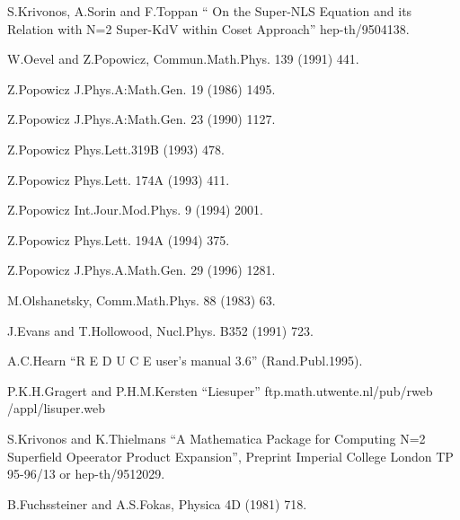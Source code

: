 \begin{thebibliography}{99}
\item{} S.Krivonos, A.Sorin and F.Toppan `` On the Super-NLS Equation and its
        Relation with N=2 Super-KdV within Coset Approach'' hep-th/9504138.

\item{} W.Oevel and Z.Popowicz, Commun.Math.Phys. 139 (1991) 441.

\item{} Z.Popowicz J.Phys.A:Math.Gen. 19 (1986) 1495.

\item{} Z.Popowicz J.Phys.A:Math.Gen. 23 (1990) 1127.

\item{} Z.Popowicz Phys.Lett.319B (1993) 478.

\item{} Z.Popowicz Phys.Lett. 174A (1993) 411.

\item{} Z.Popowicz Int.Jour.Mod.Phys. 9 (1994) 2001.

\item{} Z.Popowicz Phys.Lett. 194A (1994) 375.

\item{} Z.Popowicz J.Phys.A.Math.Gen. 29 (1996) 1281.

\item{} M.Olshanetsky, Comm.Math.Phys. 88 (1983) 63.

\item{} J.Evans and T.Hollowood, Nucl.Phys. B352 (1991) 723.

\item{} A.C.Hearn ``R E D U C E user's manual 3.6'' (Rand.Publ.1995).

\item{} P.K.H.Gragert and P.H.M.Kersten  ``Liesuper''  ftp.math.utwente.nl/pub/rweb /appl/lisuper.web

\item{} S.Krivonos and K.Thielmans ``A Mathematica Package for Computing N=2
    Superfield Opeerator Product Expansion'', Preprint Imperial College
    London TP  95-96/13 or hep-th/9512029.

\item{} B.Fuchssteiner and A.S.Fokas, Physica 4D (1981) 718.

\end{thebibliography}



